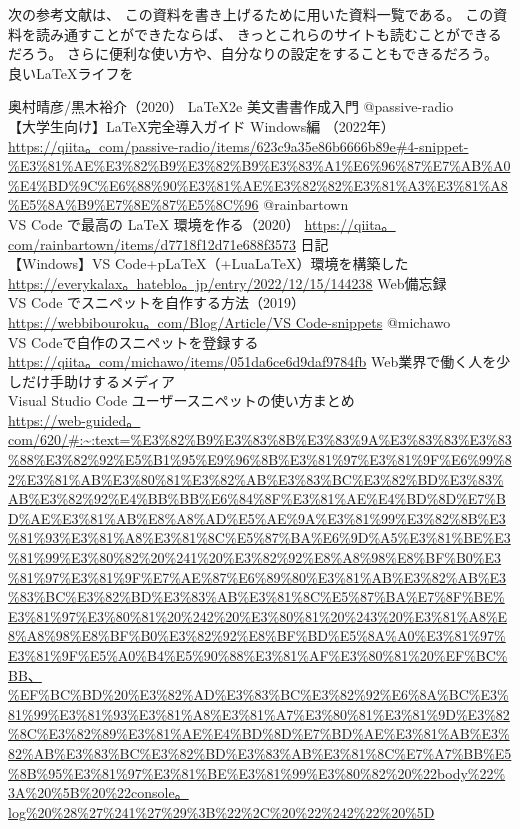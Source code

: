 \documentclass{ltjsarticle}
\begin{document}
次の参考文献は、
この資料を書き上げるために用いた資料一覧である。
この資料を読み通すことができたならば、
きっとこれらのサイトも読むことができるだろう。
さらに便利な使い方や、自分なりの設定をすることもできるだろう。
良い\LaTeX ライフを
\begin{thebibliography}{999}
  奥村晴彦/黒木裕介（2020）
  \LaTeX 2e 美文書書作成入門
  @passive-radio\\
  【大学生向け】LaTeX完全導入ガイド Windows編 （2022年）\\
  \url{https://qiita。com/passive-radio/items/623c9a35e86b6666b89e#4-snippet-%E3%81%AE%E3%82%B9%E3%82%B9%E3%83%A1%E6%96%87%E7%AB%A0%E4%BD%9C%E6%88%90%E3%81%AE%E3%82%82%E3%81%A3%E3%81%A8%E5%8A%B9%E7%8E%87%E5%8C%96}
  @rainbartown\\
  VS Code で最高の LaTeX 環境を作る（2020）
  \url{https://qiita。com/rainbartown/items/d7718f12d71e688f3573}
  日記\\
  【Windows】VS Code+pLaTeX（+LuaLaTeX）環境を構築した\\
  \url{https://everykalax。hateblo。jp/entry/2022/12/15/144238}
  Web備忘録\\
  VS Code でスニペットを自作する方法（2019）\\
  \url{https://webbibouroku。com/Blog/Article/VS Code-snippets}
  @michawo\\
  VS Codeで自作のスニペットを登録する\\
  \url{https://qiita。com/michawo/items/051da6ce6d9daf9784fb}
  Web業界で働く人を少しだけ手助けするメディア\\
  Visual Studio Code ユーザースニペットの使い方まとめ\\
  \url{https://web-guided。com/620/#:~:text=%E3%82%B9%E3%83%8B%E3%83%9A%E3%83%83%E3%83%88%E3%82%92%E5%B1%95%E9%96%8B%E3%81%97%E3%81%9F%E6%99%82%E3%81%AB%E3%80%81%E3%82%AB%E3%83%BC%E3%82%BD%E3%83%AB%E3%82%92%E4%BB%BB%E6%84%8F%E3%81%AE%E4%BD%8D%E7%BD%AE%E3%81%AB%E8%A8%AD%E5%AE%9A%E3%81%99%E3%82%8B%E3%81%93%E3%81%A8%E3%81%8C%E5%87%BA%E6%9D%A5%E3%81%BE%E3%81%99%E3%80%82%20%241%20%E3%82%92%E8%A8%98%E8%BF%B0%E3%81%97%E3%81%9F%E7%AE%87%E6%89%80%E3%81%AB%E3%82%AB%E3%83%BC%E3%82%BD%E3%83%AB%E3%81%8C%E5%87%BA%E7%8F%BE%E3%81%97%E3%80%81%20%242%20%E3%80%81%20%243%20%E3%81%A8%E8%A8%98%E8%BF%B0%E3%82%92%E8%BF%BD%E5%8A%A0%E3%81%97%E3%81%9F%E5%A0%B4%E5%90%88%E3%81%AF%E3%80%81%20%EF%BC%BB、%EF%BC%BD%20%E3%82%AD%E3%83%BC%E3%82%92%E6%8A%BC%E3%81%99%E3%81%93%E3%81%A8%E3%81%A7%E3%80%81%E3%81%9D%E3%82%8C%E3%82%89%E3%81%AE%E4%BD%8D%E7%BD%AE%E3%81%AB%E3%82%AB%E3%83%BC%E3%82%BD%E3%83%AB%E3%81%8C%E7%A7%BB%E5%8B%95%E3%81%97%E3%81%BE%E3%81%99%E3%80%82%20%22body%22%3A%20%5B%20%22console。log%20%28%27%241%27%29%3B%22%2C%20%22%242%22%20%5D}

\end{thebibliography}
\end{document}
